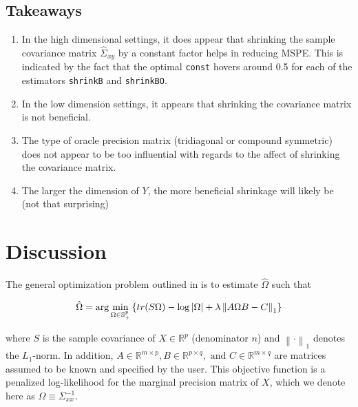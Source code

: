 \documentclass[11pt,]{report}
\begin{document}
\vspace{1cm}

\hypertarget{takeaways-1}{%
\subsection{Takeaways}\label{takeaways-1}}

\begin{enumerate}
\def\labelenumi{\arabic{enumi}.}
\item
  In the high dimensional settings, it does appear that shrinking the sample covariance matrix \(\hat{\Sigma}_{xy}\) by a constant factor helps in reducing MSPE. This is indicated by the fact that the optimal \texttt{const} hovers around 0.5 for each of the estimators \texttt{shrinkB} and \texttt{shrinkBO}.
\item
  In the low dimension settings, it appears that shrinking the covariance matrix is not beneficial.
\item
  The type of oracle precision matrix (tridiagonal or compound symmetric) does not appear to be too influential with regards to the affect of shrinking the covariance matrix.
\item
  The larger the dimension of \(Y\), the more beneficial shrinkage will likely be (not that surprising)
\end{enumerate}

\hypertarget{discussion}{%
\section{Discussion}\label{discussion}}

The general optimization problem outlined in \citet{molstad2017shrinking} is to estimate \(\hat{\Omega}\) such that

\begin{equation}
  \hat{\Omega} = \arg\min_{\Omega \in \mathbb{S}_{+}^{p}}\left\{ tr(S\Omega) - \log\left| \Omega \right| + \lambda\left\| A\Omega B - C \right\|_{1} \right\}
\label{eq:penloglik3}\notag
\end{equation}

where \(S\) is the sample covariance of \(X \in \mathbb{R}^{p}\) (denominator \(n\)) and \(\left\| \cdot \right\|_{1}\) denotes the \(L_{1}\)-norm. In addition, \(A \in \mathbb{R}^{m \times p}, B \in \mathbb{R}^{p \times q}, \mbox{ and } C \in \mathbb{R}^{m \times q}\) are matrices assumed to be known and specified by the user. This objective function is a penalized log-likelihood for the marginal precision matrix of \(X\), which we denote here as \(\Omega \equiv \Sigma_{xx}^{-1}\).
\end{document}
